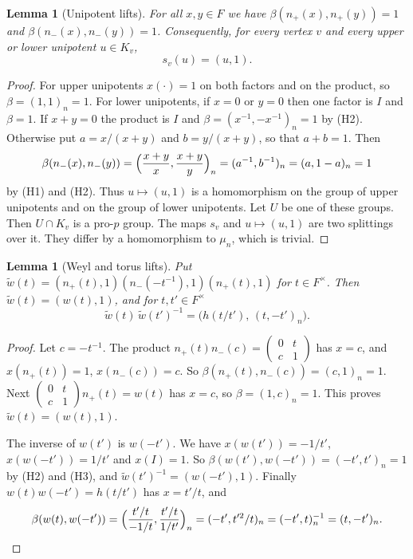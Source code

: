 \documentclass[12pt,letterpaper]{article}
\numberwithin{equation}{section}
\newtheorem{lemma}[theorem]{Lemma}
\theoremstyle{definition}
\theoremstyle{remark}
\newcommand{\np}{n_{+}}
\newcommand{\nm}{n_{-}}
\newcommand{\sm}[4]{\left(\begin{smallmatrix}#1&#2\\#3&#4\end{smallmatrix}\right)}
\begin{document}
\begin{lemma}[Unipotent lifts]\label{lem:unip}
For all $x,y\in F$ we have $\beta(\np(x),\np(y))=1$ and $\beta(\nm(x),\nm(y))=1$. Consequently, for every vertex $v$ and every upper or lower unipotent $u\in K_v$,
\[
 s_v(u)=(u,1).
\]
\end{lemma}
\begin{proof}
For upper unipotents $x(\cdot)=1$ on both factors and on the product, so $\beta=(1,1)_n=1$. For lower unipotents, if $x=0$ or $y=0$ then one factor is $I$ and $\beta=1$. If $x+y=0$ the product is $I$ and $\beta=(x^{-1},-x^{-1})_n=1$ by (H2). Otherwise put $a=x/(x+y)$ and $b=y/(x+y)$, so that $a+b=1$. Then
\[
 \beta(\nm(x),\nm(y))=\Bigl(\frac{x+y}{x},\frac{x+y}{y}\Bigr)_n=(a^{-1},b^{-1})_n=(a,1-a)_n=1
\]
by (H1) and (H2). Thus $u\mapsto(u,1)$ is a homomorphism on the group of upper unipotents and on the group of lower unipotents. Let $U$ be one of these groups. Then $U\cap K_v$ is a pro-$p$ group. The maps $s_v$ and $u\mapsto(u,1)$ are two splittings over it. They differ by a homomorphism to $\mu_n$, which is trivial.
\end{proof}

\begin{lemma}[Weyl and torus lifts]\label{lem:weyl}
Put $\widetilde w(t)=(\np(t),1)(\nm(-t^{-1}),1)(\np(t),1)$ for $t\in F^\times$. Then $\widetilde w(t)=(w(t),1)$, and for $t,t'\in F^\times$
\begin{equation}\label{eq:torus}
 \widetilde w(t)\,\widetilde w(t')^{-1}=\bigl(h(t/t'),\,(t,-t')_n\bigr).
\end{equation}
\end{lemma}
\begin{proof}
Let $c=-t^{-1}$. The product $\np(t)\nm(c)=\sm{0}{t}{c}{1}$ has $x=c$, and $x(\np(t))=1$, $x(\nm(c))=c$. So $\beta(\np(t),\nm(c))=(c,1)_n=1$. Next $\sm0tc1\np(t)=w(t)$ has $x=c$, so $\beta=(1,c)_n=1$. This proves $\widetilde w(t)=(w(t),1)$.

The inverse of $w(t')$ is $w(-t')$. We have $x(w(t'))=-1/t'$, $x(w(-t'))=1/t'$ and $x(I)=1$. So $\beta(w(t'),w(-t'))=(-t',t')_n=1$ by (H2) and (H3), and $\widetilde w(t')^{-1}=(w(-t'),1)$. Finally $w(t)w(-t')=h(t/t')$ has $x=t'/t$, and
\[
 \beta(w(t),w(-t'))=\Bigl(\frac{t'/t}{-1/t},\frac{t'/t}{1/t'}\Bigr)_n=(-t',t'^2/t)_n=(-t',t)_n^{-1}=(t,-t')_n .
\]
\end{proof}
\end{document}

